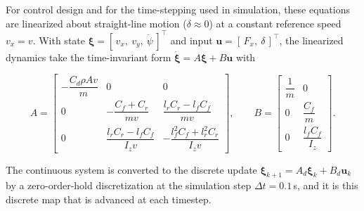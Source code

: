 For control design and for the time-stepping used in simulation, these equations are
linearized about straight-line motion ($\delta \approx 0$) at a constant reference speed
$v_x = v$. With state $\boldsymbol{\xi} = [\,v_x,\ v_y,\ \dot{\psi}\,]^\top$ and input
$\mathbf{u} = [\,F_x,\ \delta\,]^\top$, the linearized dynamics take the time-invariant form
$\dot{\boldsymbol{\xi}} = A\boldsymbol{\xi} + B\mathbf{u}$ with

\begin{equation}
    A = \begin{bmatrix}
        -\dfrac{C_d \rho A v}{m} & 0 & 0 \\[2.2mm]
        0 & -\dfrac{C_f + C_r}{m v} & \dfrac{l_r C_r - l_f C_f}{m v} \\[2.2mm]
        0 & \dfrac{l_r C_r - l_f C_f}{I_z v} & -\dfrac{l_f^2 C_f + l_r^2 C_r}{I_z v}
    \end{bmatrix},
    \qquad
    B = \begin{bmatrix}
        \dfrac{1}{m} & 0 \\[2.2mm]
        0 & \dfrac{C_f}{m} \\[2.2mm]
        0 & \dfrac{l_f C_f}{I_z}
    \end{bmatrix}.
    \label{eq:tractor_ss}
\end{equation}

The continuous system is converted to the discrete update
$\boldsymbol{\xi}_{k+1} = A_d \boldsymbol{\xi}_k + B_d \mathbf{u}_k$ by a zero-order-hold
discretization at the simulation step $\Delta t = 0.1$\,s, and it is this discrete map that is
advanced at each timestep. 

